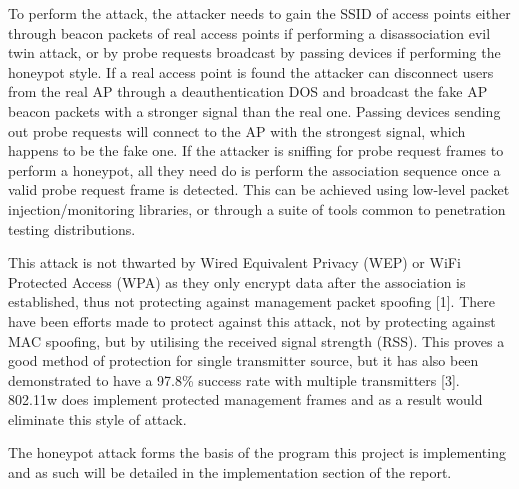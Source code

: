 To perform the attack, the attacker needs to gain the SSID of access points either through beacon packets of real access points if performing a disassociation evil twin attack, or by probe requests broadcast by passing devices if performing the honeypot style. If a real access point is found the attacker can disconnect users from the real AP through a deauthentication DOS and broadcast the fake AP beacon packets with a stronger signal than the real one. Passing devices sending out probe requests will connect to the AP with the strongest signal, which happens to be the fake one. If the attacker is sniffing for probe request frames to perform a honeypot, all they need do is perform the association sequence once a valid probe request frame is detected. This can be achieved using low-level packet injection/monitoring libraries, or through a suite of tools common to penetration testing distributions.  

This attack is not thwarted by Wired Equivalent Privacy (WEP) or WiFi Protected Access (WPA) as they only encrypt data after the association is established, thus not protecting against management packet spoofing [1]. There have been efforts made to protect against this attack, not by protecting against MAC spoofing, but by utilising the received signal strength (RSS). This proves a good method of protection for single transmitter source, but it has also been demonstrated to have a 97.8\% success rate with multiple transmitters [3]. 802.11w does implement protected management frames and as a result would eliminate this style of attack.

The honeypot attack forms the basis of the program this project is implementing and as such will be detailed in the implementation section of the report.